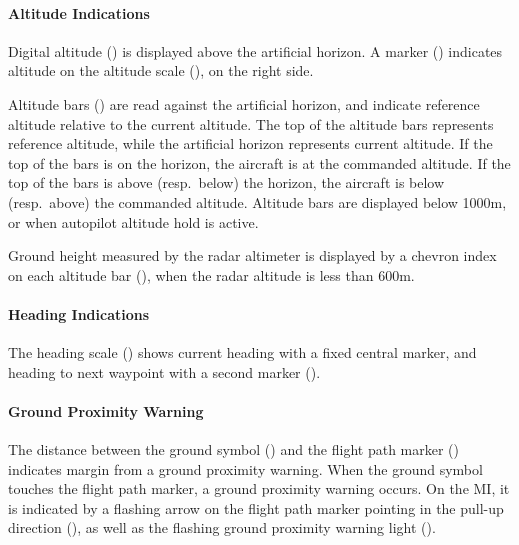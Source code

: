 \paragraph{Altitude Indications}
Digital altitude () is displayed above the artificial horizon.
A marker () indicates altitude
on the altitude scale (), on the right side.

Altitude bars () are read against the artificial horizon,
and indicate reference altitude relative to the current altitude.
The top of the altitude bars represents reference altitude,
while the artificial horizon represents current altitude.
If the top of the bars is on the horizon, the aircraft is at the commanded altitude.
If the top of the bars is above (resp.\ below) the horizon,
the aircraft is below (resp.\ above) the commanded altitude.
Altitude bars are displayed below 1000m, or when autopilot altitude hold is active.

Ground height measured by the radar altimeter is displayed by a chevron index on each altitude bar
(), when the radar altitude is less than 600m.

\paragraph{Heading Indications}
The heading scale () shows current heading with a fixed central marker,
and heading to next waypoint with a second marker ().

\paragraph{Ground Proximity Warning}
The distance between the ground symbol ()
and the flight path marker ()
indicates margin from a ground proximity warning.
When the ground symbol touches the flight path marker, a ground proximity warning occurs.
On the MI, it is indicated by a flashing arrow on the flight path marker
pointing in the pull-up direction (),
as well as the flashing ground proximity warning light ().

